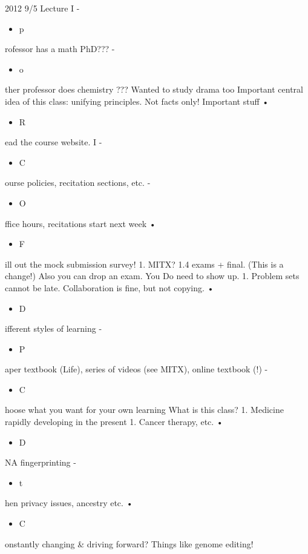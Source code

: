 2012
9/5
Lecture I
-\begin{itemize}\item  p\end{itemize}rofessor has a math PhD???
-\begin{itemize}\item  o\end{itemize}ther professor does chemistry ??? Wanted to study drama too
Important central idea of this class: unifying
principles.
Not facts
only!
Important stuff
•\begin{itemize}\item  R\end{itemize}ead the course website.
I -\begin{itemize}\item  C\end{itemize}ourse policies, recitation sections, etc.
-\begin{itemize}\item  O\end{itemize}ffice hours, recitations start next week
•\begin{itemize}\item  F\end{itemize}ill out the mock submission survey!
1. MITX?
1.4 exams + final. (This is a change!) Also you can drop an exam.
You Do need to show up.
1. Problem sets cannot be late. Collaboration is fine, but not copying.
•\begin{itemize}\item  D\end{itemize}ifferent styles of learning
-\begin{itemize}\item  P\end{itemize}aper textbook (Life), series of videos (see MITX), online textbook (!)
-\begin{itemize}\item  C\end{itemize}hoose what you want for your own learning
What is this class?
1. Medicine rapidly developing in the present
1. Cancer therapy, etc.
•\begin{itemize}\item  D\end{itemize}NA fingerprinting -\begin{itemize}\item  t\end{itemize}hen privacy issues, ancestry etc.
•\begin{itemize}\item  C\end{itemize}onstantly changing \& driving forward? Things like genome editing!

